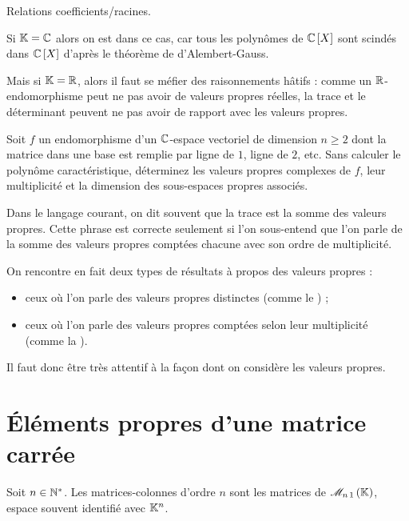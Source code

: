 \begin{dem}
Relations coefficients/racines.
\end{dem}

Si \(\mathbb{K}=\mathbb{C}\) alors on est dans ce cas, car tous les polynômes de \(\poly[\C]\) sont scindés dans \(\poly[\C]\) d'après le théorème de d'Alembert-Gauss.

Mais si \(\mathbb{K}=\mathbb{R}\), alors il faut se méfier des raisonnements hâtifs : comme un \(\mathbb{R}\)-endomorphisme peut ne pas avoir de valeurs propres réelles, la trace et le déterminant peuvent ne pas avoir de rapport avec les valeurs propres.

\begin{exo}
Soit \(f\) un endomorphisme d'un \(\mathbb{C}\)-espace vectoriel de dimension \(n\geq2\) dont la matrice dans une base est remplie par ligne de \(1\), ligne de \(2\), etc. Sans calculer le polynôme caractéristique, déterminez les valeurs propres complexes de \(f\), leur multiplicité et la dimension des sous-espaces propres associés.
\end{exo}

\begin{rem}
Dans le langage courant, on dit souvent que la trace est la somme des valeurs propres. Cette phrase est correcte seulement si l'on sous-entend que l'on parle de la somme des valeurs propres comptées chacune avec son ordre de multiplicité.

On rencontre en fait deux types de résultats à propos des valeurs propres :

\begin{itemize}
    \item ceux où l'on parle des valeurs propres distinctes (comme le ) ; \\
    \item ceux où l'on parle des valeurs propres comptées selon leur multiplicité (comme la ).
\end{itemize}

Il faut donc être très attentif à la façon dont on considère les valeurs propres.
\end{rem}

\section{Éléments propres d'une matrice carrée}

Soit \(n\in\mathbb{N}^*\). Les matrices-colonnes d'ordre \(n\) sont les matrices de \(\M{n\,1}\), espace souvent identifié avec \(\mathbb{K}^n\).

